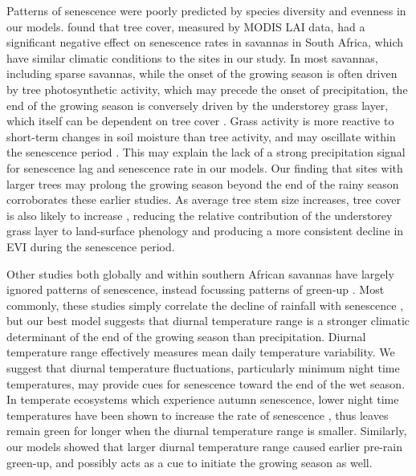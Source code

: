 \begin{refsection}
Patterns of senescence were poorly predicted by species diversity and evenness in our models. \citet{Cho2017} found that tree cover, measured by MODIS LAI data, had a significant negative effect on senescence rates in savannas in South Africa, which have similar climatic conditions to the sites in our study. In most savannas, including sparse savannas, while the onset of the growing season is often driven by tree photosynthetic activity, which may precede the onset of precipitation, the end of the growing season is conversely driven by the understorey grass layer, which itself can be dependent on tree cover \citep{Cho2017, Guan2014}. Grass activity is more reactive to short-term changes in soil moisture than tree activity, and may oscillate within the senescence period \citep{Archibald2007}. This may explain the lack of a strong precipitation signal for senescence lag and senescence rate in our models. Our finding that sites with larger trees may prolong the growing season beyond the end of the rainy season corroborates these earlier studies. As average tree stem size increases, tree cover is also likely to increase \citep{Panzou2020}, reducing the relative contribution of the understorey grass layer to land-surface phenology and producing a more consistent decline in EVI during the senescence period. 

Other studies both globally and within southern African savannas have largely ignored patterns of senescence, instead focussing patterns of green-up \citep{Gallinat2015}. Most commonly, these studies simply correlate the decline of rainfall with senescence \citep{Guan2014}, but our best model suggests that diurnal temperature range is a stronger climatic determinant of the end of the growing season than precipitation. Diurnal temperature range effectively measures mean daily temperature variability. We suggest that diurnal temperature fluctuations, particularly minimum night time temperatures, may provide cues for senescence toward the end of the wet season. In temperate ecosystems which experience autumn senescence, lower night time temperatures have been shown to increase the rate of senescence \citep{Michelson2017, Escamilla2020}, thus leaves remain green for longer when the diurnal temperature range is smaller. Similarly, our models showed that larger diurnal temperature range caused earlier pre-rain green-up, and possibly acts as a cue to initiate the growing season as well.


\end{refsection}

